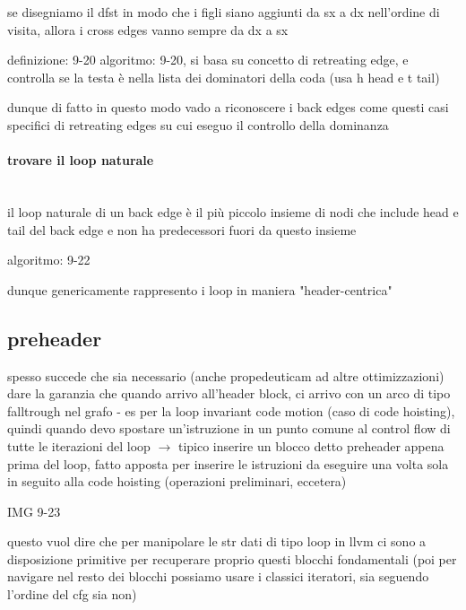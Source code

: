 \begin{emphasize}
    se disegniamo il dfst in modo che i figli siano aggiunti da sx a dx nell'ordine di visita, allora i cross edges vanno sempre da dx a sx
\end{emphasize}

definizione: 9-20
algoritmo: 9-20, si basa su concetto di retreating edge, e controlla se la testa \`e nella lista dei dominatori della coda (usa h head e t tail)

dunque di fatto in questo modo vado a riconoscere i back edges come questi casi specifici di retreating edges su cui eseguo il controllo della dominanza

\paragraph{trovare il loop naturale}~\\

il loop naturale di un back edge \`e il pi\`u piccolo insieme di nodi che include head e tail del back edge e non ha predecessori fuori da questo insieme 

algoritmo: 9-22

dunque genericamente rappresento i loop in maniera "header-centrica"

\subsection{preheader}

spesso succede che sia necessario (anche propedeuticam ad altre ottimizzazioni) dare la garanzia che quando arrivo all'header block, ci arrivo con un arco di tipo falltrough nel grafo - es per la loop invariant code motion (caso di code hoisting), quindi quando devo spostare un'istruzione in un punto comune al control flow di tutte le iterazioni del loop $\rightarrow$ tipico inserire un blocco detto preheader appena prima del loop, fatto apposta per inserire le istruzioni da eseguire una volta sola in seguito alla code hoisting (operazioni preliminari, eccetera)

IMG 9-23

\begin{emphasize}
  questo vuol dire che per manipolare le str dati di tipo loop in llvm ci sono a disposizione primitive per recuperare proprio questi blocchi fondamentali (poi per navigare nel resto dei blocchi possiamo usare i classici iteratori, sia seguendo l'ordine del cfg sia non)
\end{emphasize}

